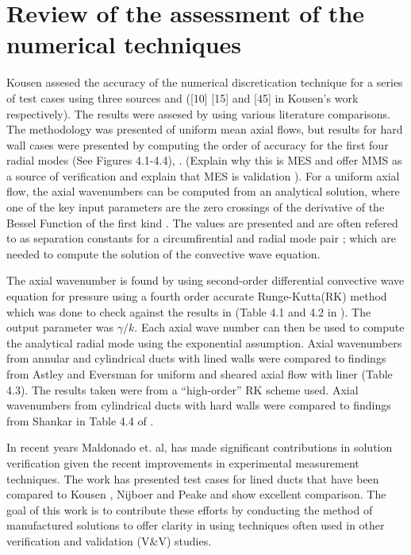 
\section{Review of the assessment of the numerical techniques} 
Kousen assesed the accuracy of the numerical discretication technique for 
a series of test cases using three sources \cite{Shankar1972} \cite{Vo1978} and 
\cite{Astley1979} ([10] [15] and [45] in Kousen's work \cite{kousen1996pressure}
respectively).  The results were assesed by using various
literature comparisons. The methodology was presented of uniform mean axial flows,
but results for hard wall cases were presented by computing the order of accuracy for
the first four radial modes (See Figures 4.1-4.4), . (Explain why this is MES and offer MMS as a source
of verification and explain that MES is validation \cite{Roy2005} \cite{Salari2000} ). For a uniform axial flow, 
the axial wavenumbers can be computed from an analytical solution, where 
one of the key input parameters are the zero crossings of the derivative
of the Bessel Function of the first kind . The values are presented 
\cite{Kerrebrock1992} and are often refered to as separation constants 
for a circumfirential and radial mode pair ; which are needed to compute the solution 
of the convective wave equation.  

The axial wavenumber is found by using second-order differential convective 
wave equation for pressure using a fourth order accurate 
Runge-Kutta(RK) method \cite{kousen1995eigenmode} which was done to check 
against the results in \cite{Agarwal1989} (Table 4.1 and 4.2 in \cite{kousen1995eigenmode}). 
The output parameter was $\gamma/k$.  Each axial wave number can then be used 
to compute the analytical radial mode using the 
exponential assumption.  
Axial wavenumbers from annular and cylindrical ducts with lined walls were 
compared to findings from Astley and Eversman \cite{Astley1979} for uniform and 
sheared axial flow with liner (Table 4.3).  The results taken were from a ``high-order'' RK 
scheme used. Axial wavenumbers from cylindrical ducts with hard walls were 
compared to findings from Shankar \cite{Shankar1972} in Table 4.4 of \cite{kousen1995eigenmode}. 

In recent years  Maldonado et. al, \cite{Maldonado2016} has made significant 
contributions in solution verification given the recent improvements in 
experimental measurement techniques. The work has presented test cases for 
lined ducts that have been compared to Kousen \cite{kousen1995eigenmode}, Nijboer
\cite{Nijboer2001} and Peake \cite{Posson2013} and show excellent comparison. 
The goal of this work is to contribute these efforts by conducting the method
of manufactured solutions to offer clarity in using techniques often used in other
verification and validation (V\&V) studies. 
